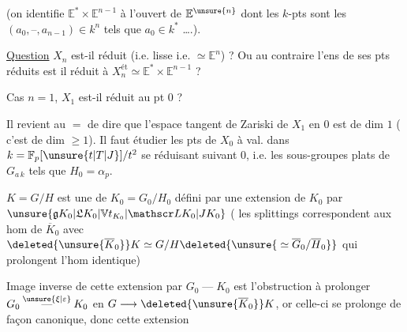 (on identifie $\mathbb E^*\times\mathbb E^{n-1}$ à l'ouvert de $\mathbb E^{\unsure{n}}$ dont les  $k$-pts sont les $(a_0,\text{--},a_{n-1})\in k^n$ tels que $a_0\in k^*$ \ldots.).

\uline{Question} $X_n$ est-il réduit (i.e. lisse i.e. $\simeq\mathbb E^n$) ? Ou au contraire l'ens de ses pts réduits est il réduit à $X_n^{\mathrm{ét}}\simeq\mathbb E^*\times\mathbb E^{n-1}$ ?

Cas $n=1$, $X_1$ est-il réduit  au pt $0$ ?

Il revient au $=$ de dire que l'espace tangent de Zariski de $X_1$ en $0$ est de dim $1$ ( c'est de dim $\geq1$).  Il faut étudier les pts de $X_0$ à val. dans $k=\mathbb F_p[\unsure{t|T|J}]/t^2$ se réduisant suivant $0$, i.e.  les sous-groupes plats  de $G_{a\,k}$ tels que $H_0=\alpha_p$.

$K=G/H$ est une  de $K_0=G_0/H_0$ défini par une extension de $K_0$ par $\unsure{\mathfrak g K_0|\mathfrak L K_0|\mathbb V t_{K_0}|\mathscr L K_0|J K_0}$ ( les splittings correspondent aux hom de $\overline K_0$  avec $\deleted{\unsure{\overline K_0}}K\simeq G/H\deleted{\unsure{{}\simeq\overline G_0/\overline H_0}}$ \deleted{\unsure{)}} qui prolongent l'hom identique)

Image inverse de cette extension par $G_0\mathbin{\text{---}}K_0$ est l'obstruction à prolonger $G_0\overset{\unsure{\xi|\varepsilon}}{\mathbin{\text{---}}}K_0$ en $G\longrightarrow\deleted{\unsure{\overline K_0}}K$, or celle-ci se prolonge de façon canonique,  donc cette extension
